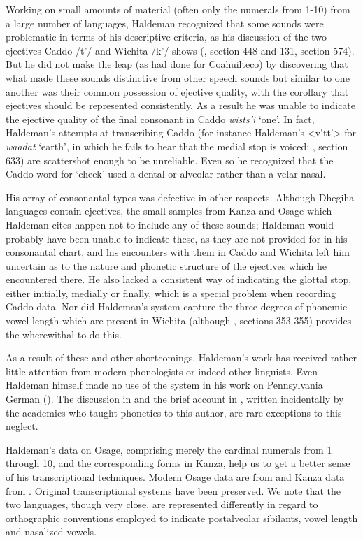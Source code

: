 \documentclass[output=paper]{LSP/langsci}
\begin{document}
Working on small amounts of material (often only the numerals from 1-10) from a large number of languages, Haldeman recognized that some sounds were problematic in terms of his descriptive criteria, as his discussion of the two ejectives  Caddo /t'/ and Wichita /k'/ shows (\citealt[3]{Haldeman1860}, section 448 and 131, section 574).  But he did not make the leap (as \citealt{Garcia1760} had done for Coahuilteco) by discovering that what made these sounds distinctive from other speech sounds but similar to one another was their common possession of ejective quality, with the corollary that ejectives should be represented consistently.  As a result he was unable to indicate the ejective quality of the final consonant in Caddo \textit{wists'i} `one'.  In fact, Haldeman's attempts at transcribing Caddo (for instance Haldeman's <v\'{}tt'> for \textit{waadat} `earth', in which he fails to hear that the medial stop is voiced: \citealt[3]{Haldeman1860}, section 633) are scattershot enough to be unreliable. Even so he recognized that the Caddo word for `cheek'  used a dental or alveolar rather than a velar nasal.    

His array of consonantal types was defective in other respects. Although Dhegiha languages contain ejectives, the small samples from Kanza and Osage which Haldeman cites happen not to include any of these sounds; Haldeman would probably have been unable to indicate these, as they are not provided for in his consonantal chart, and his encounters with them in Caddo and Wichita left him uncertain as to the nature and phonetic structure of the ejectives which he encountered there.  He also lacked a consistent way of indicating the glottal stop, either initially, medially or finally, which is a special problem when recording Caddo data. Nor did Haldeman's system capture the three degrees of phonemic vowel length which are present in Wichita (although \citealt[3]{Haldeman1860}, sections 353-355) provides the wherewithal to do this.  

As a result of these and other shortcomings, Haldeman's work has received rather little attention from modern phonologists or indeed other linguists.  Even Haldeman himself made no use of the system in his work on Pennsylvania German (\citealt{Haldeman1872}).  The discussion in \citet{Pilling1887} and the brief account in \citet{KellyLocal1989}, written incidentally by the academics who taught phonetics to this author, are  rare exceptions to this neglect.   

Haldeman's data on Osage, comprising merely the cardinal numerals from 1 through 10, and the corresponding forms in Kanza, help us to get a better sense of his transcriptional techniques. Modern Osage data are from \citet{Quintero2009} and Kanza data from \citet{CumberlandRankin2012}.  Original transcriptional systems have been preserved. We note that the two languages, though very close, are represented differently in regard to orthographic conventions employed to indicate postalveolar sibilants, vowel length and nasalized vowels. 
\end{document}
